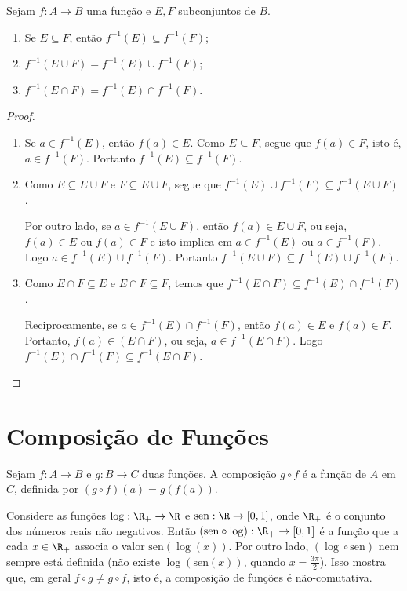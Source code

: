 \begin{proposition}\label{Img-inversa}
Sejam $f:A \rightarrow B$ uma fun\c{c}\~ao e $E, F$ subconjuntos de $B$.
\begin{enumerate}
    \item[(a)] Se $E \subseteq F$, ent\~ao $f^{-1}(E)\subseteq f^{-1}(F)$;
    \item[(b)] $f^{-1}(E \cup F)=f^{-1}(E)\cup f^{-1}(F)$;
    \item[(c)] $f^{-1}(E \cap F)=f^{-1}(E)\cap f^{-1}(F)$.
\end{enumerate}
\end{proposition}
\begin{proof}\mbox{}
\begin{enumerate}
    \item[(a)] Se $a \in f^{-1}(E)$, ent\~ao $f(a) \in E$.
    Como $E \subseteq F$, segue que $f(a) \in F$, isto \'e,
    $a \in f^{-1}(F)$. Portanto $f^{-1}(E)\subseteq f^{-1}(F)$.
    \item[(b)] Como $E \subseteq E \cup F$ e $F \subseteq E \cup
    F$, segue que $f^{-1}(E) \cup f^{-1}(F) \subseteq f^{-1}(E \cup
    F)$.

    Por outro lado, se $a \in f^{-1}(E \cup F)$, ent\~ao $f(a) \in E
    \cup F$, ou seja, $f(a) \in E$ ou $f(a) \in F$ e isto implica em
    $a \in f^{-1}(E)$ ou $a \in f^{-1}(F)$. Logo $a \in
    f^{-1}(E)\cup f^{-1}(F)$. Portanto $f^{-1}(E \cup F)
    \subseteq f^{-1}(E)\cup f^{-1}(F)$.
    \item[(c)] Como $E \cap F \subseteq E$ e $E \cap F \subseteq
    F$, temos que $f^{-1}(E \cap F)\subseteq f^{-1}(E)\cap
    f^{-1}(F)$.

    Reciprocamente, se $a \in f^{-1}(E) \cap f^{-1}(F)$, ent\~ao
    $f(a) \in E$ e $f(a) \in F$. Portanto, $f(a) \in (E \cap
    F)$, ou seja, $a \in f^{-1}(E \cap F)$. Logo $f^{-1}(E)
    \cap f^{-1}(F) \subseteq f^{-1}(E \cap F)$.
\end{enumerate}
\end{proof}

\section{Composi\c{c}\~ao de Fun\c{c}\~oes}
\begin{definition}
Sejam $f:A \rightarrow B$ e $g:B \rightarrow C$ duas fun\c{c}\~oes. A
composi\c{c}\~ao $g \circ f$ \'e a fun\c{c}\~ao de $A$ em $C$, definida por $(g
\circ f)(a)=g(f(a))$.
\end{definition}
\begin{example}\label{log-sen}
Considere as fun\c{c}\~oes $\log :\R_+ \rightarrow \R$ e $\mbox{sen}:\R
\rightarrow [0,1]$, onde $\R_+$ \'e o conjunto dos n\'umeros reais n\~ao
negativos. Ent\~ao $(\mbox{sen} \circ \log):\R_+ \rightarrow [0,1]$
\'e a fun\c{c}\~ao que a cada $x \in \R_+$ associa o valor
$\mbox{sen}(\log(x))$. Por outro lado, $(\log \circ \mbox{sen})$
nem sempre est\'a definida (n\~ao existe $\log( \mbox{sen}(x))$,
quando $x= \frac{3\pi}{2}$). Isso mostra que, em geral $f \circ g
\neq g \circ f$, isto \'e, a composi\c{c}\~ao de fun\c{c}\~oes \'e n\~ao-comutativa.
\end{example}

